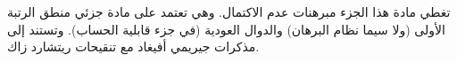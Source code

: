 \documentclass[../../include/open-logic-part]{subfiles}
\begin{document}

\begin{editorial}
 تغطي مادة هذا الجزء مبرهنات عدم الاكتمال. وهي تعتمد على مادة جزئي
 منطق الرتبة الأولى (ولا سيما نظام البرهان) والدوال العودية (في جزء
 قابلية الحساب). وتستند إلى مذكرات جيريمي أفيغاد مع تنقيحات ريتشارد زاك.
\end{editorial}






\OLEndPartHook
\end{document}
